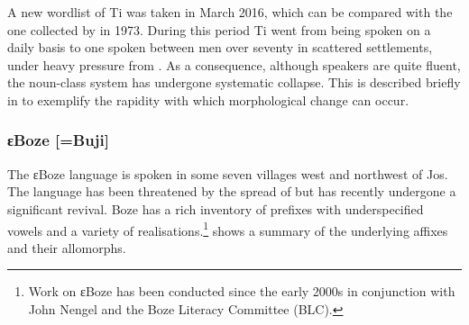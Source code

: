 \documentclass[output=paper]{langsci/langscibook}
\begin{document}
A new wordlist of Ti was taken in  March 2016, which can be compared with the one collected by \citet{Shimizu1979} in 1973. During this period Ti went from being spoken on a daily basis to one spoken between men over seventy in scattered settlements, under heavy pressure from . As a consequence, although speakers are quite fluent, the noun-class system has undergone systematic collapse. This is described briefly in  to exemplify the rapidity with which morphological change can occur.



\subsubsection{ɛBoze [=Buji]}\label{sec:kainji:3.5.2}
The ɛBoze language is spoken in some seven villages west and northwest of Jos. The language has been threatened by the spread of  but has recently undergone a significant revival. Boze has a rich inventory of prefixes with underspecified vowels and a variety of realisations.\footnote{Work on ɛBoze has been conducted since the early 2000s in conjunction with John Nengel and the Boze Literacy Committee (BLC).}  shows a summary of the underlying affixes and their allomorphs.
\end{document}
